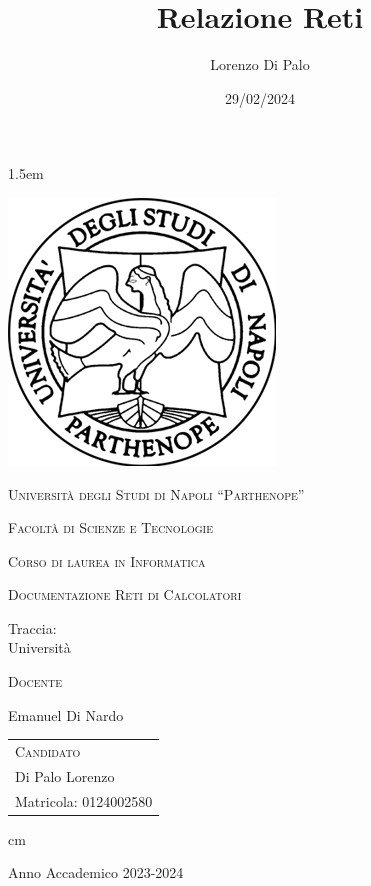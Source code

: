 \documentclass[12pt,italian,a4paper,oneside,openright]{book}
\title{Relazione Reti}
\author{Lorenzo Di Palo}
\date{29/02/2024}
\begin{document}
	
	\baselineskip 1.5em
	
	{ \thispagestyle{empty}
		
		\begin{center}
				\includegraphics[scale=0.7]{img/logo.png}
		\end{center}
		\vskip 1cm \large \centerline{\textsc{Università degli Studi di
				Napoli ``Parthenope''}}
		
		\centerline {\textsc{Facoltà di Scienze e Tecnologie}}
		
		\centerline {\small\textsc{Corso di laurea in Informatica}}
		
	
		
		\vskip 0.5cm
		
		\large \centerline {\textsc{Documentazione Reti di Calcolatori}}
		
		\vskip 0.5cm
		
		\Large \centerline {Traccia:\\Università}
		
		
		\vskip 4.5cm
		
		
		\large
		\begin{minipage}[t]{7cm}
			\textsc{Docente}
			
			Emanuel Di Nardo\\
			
		\end{minipage}
		\hfill
		\begin{tabular}[t]{l}
			\textsc{Candidato} \\
			Di Palo Lorenzo\\
			Matricola: 0124002580
		\end{tabular}
		
		 cm \Large \centerline {Anno Accademico 2023-2024}
		\vfill \eject}
	
	
	\tableofcontents
	
	\newpage
	
	
	
	
	
	
	
	
	\newpage
	\pagestyle{plain}
	
	
\end{document}
